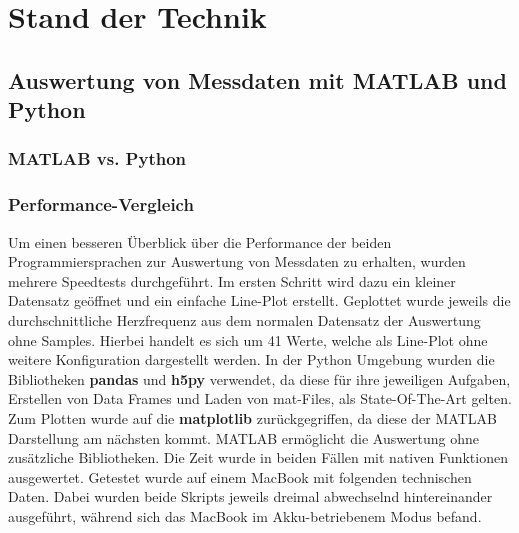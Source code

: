 
\chapter{Stand der Technik}


\section{Auswertung von Messdaten mit MATLAB und Python}



\subsection{MATLAB vs. Python}



\subsection{Performance-Vergleich}

Um einen besseren Überblick über die Performance der beiden Programmiersprachen zur Auswertung von Messdaten zu erhalten, wurden mehrere Speedtests durchgeführt. Im ersten Schritt wird dazu ein kleiner Datensatz geöffnet und ein einfache Line-Plot erstellt. Geplottet wurde jeweils die durchschnittliche Herzfrequenz aus dem normalen Datensatz der Auswertung ohne Samples. Hierbei handelt es sich um 41 Werte, welche als Line-Plot ohne weitere Konfiguration dargestellt werden. In der Python Umgebung wurden die Bibliotheken \textbf{pandas} und \textbf{h5py} verwendet, da diese für ihre jeweiligen Aufgaben, Erstellen von Data Frames und Laden von mat-Files, als State-Of-The-Art gelten. Zum Plotten wurde auf die \textbf{matplotlib} zurückgegriffen, da diese der MATLAB Darstellung am nächsten kommt. MATLAB ermöglicht die Auswertung ohne zusätzliche Bibliotheken. Die Zeit wurde in beiden Fällen mit nativen Funktionen ausgewertet. Getestet wurde auf einem MacBook mit folgenden technischen Daten. Dabei wurden beide Skripts jeweils dreimal abwechselnd hintereinander ausgeführt, während sich das MacBook im Akku-betriebenem Modus befand.

